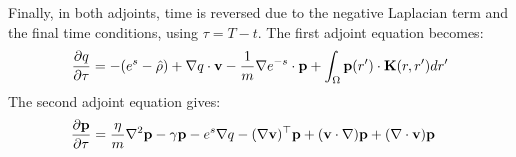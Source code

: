 Finally, in both adjoints, time is reversed due to the negative Laplacian term and the final time conditions, using $\tau = T-t$. 
The first adjoint equation becomes:
\begin{align*}
\frac{\partial q}{\partial \tau}  = - (e^s - \hat {\rho})+ \nabla q \cdot \mathbf{v} -\frac{1}{m}\nabla e^{-s}\cdot \mathbf{p}  +  \int_\Omega  \mathbf{p}(r') \cdot\mathbf{K}(r,r')   dr' 
\end{align*}
The second adjoint equation gives:
\begin{align*}
&\frac{\partial \mathbf{p}}{\partial \tau} =   \frac{\eta}{m} \nabla^2 \mathbf{p}  - \gamma\mathbf{p}-e^s\nabla q -(\nabla \mathbf{v})^\top\mathbf{p} 
+ (\mathbf{v} \cdot \nabla)\mathbf{p} +  (\nabla \cdot \mathbf{v})\mathbf{p}  
\end{align*}